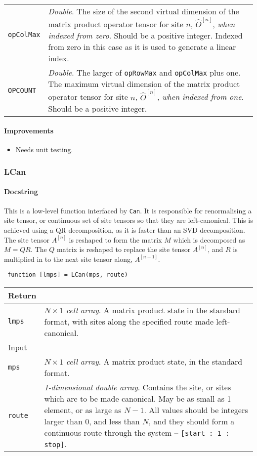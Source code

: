 \begin{longtabu}{X[1,l]X[4,l]}
 \lstinline$opColMax$ & \emph{Double}. The size of the second virtual dimension of the matrix product operator tensor for site \(n\), \(\hat{O}^{[n]}\), \emph{when indexed from zero}. Should be a positive integer. Indexed from zero in this case as it is used to generate a linear index. \\
 \lstinline$OPCOUNT$ & \emph{Double}. The larger of \lstinline$opRowMax$ and \lstinline$opColMax$ plus one. The maximum virtual dimension of the matrix product operator tensor for site \(n\), \(\hat{O}^{[n]}\), \emph{when indexed from one}. Should be a positive integer. \\
 \hline
 \end{longtabu}
 \paragraph{Improvements}
 \begin{itemize}
 \item Needs unit testing.
 \end{itemize}
 
 \subsubsection{LCan}
 \paragraph{Docstring} This is a low-level function interfaced by \lstinline$Can$. It is responsible for renormalising a site tensor, or continuous set of site tensors so that they are left-canonical. This is achieved using a QR decomposition, as it is faster than an SVD decomposition. The site tensor \(A^{[n]}\) is reshaped to form the matrix \(M\) which is decomposed as \(M=QR\). The \(Q\) matrix is reshaped to replace the site tensor \(A^{[n]}\), and \(R\) is multiplied in to the next site tensor along, \(A^{[n+1]}\).
 \begin{lstlisting}
 function [lmps] = LCan(mps, route) \end{lstlisting}
 \begin{longtabu}{X[1,l]X[4,l]}
 \hline
 Return & \\ \hline
 \lstinline$lmps$ & \emph{\(N \times 1\) cell array}. A matrix product state in the standard format, with sites along the specified route made left-canonical. \\ \hline
 Input & \\ \hline
 \lstinline$mps$ & \emph{\(N \times 1\) cell array}. A matrix product state, in the standard format. \\
 \lstinline$route$ & \emph{1-dimensional double array}. Contains the site, or sites which are to be made canonical. May be as small as 1 element, or as large as \(N - 1\). All values should be integers larger than 0, and less than \(N\), and they should form a continuous route through the system -- \lstinline$[start : 1 : stop]$. \\
 \hline
 \end{longtabu}
